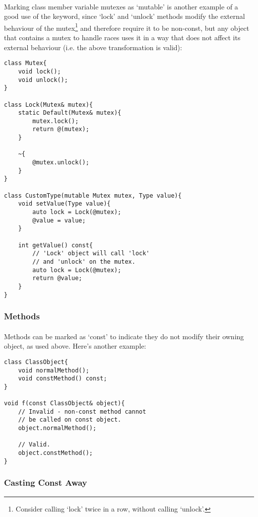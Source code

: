 \documentclass[12pt,twoside,notitlepage]{report}
\begin{document}
\paragraph{}
Marking class member variable mutexes as `mutable' is another example of a good use of the keyword, since `lock' and `unlock' methods modify the external behaviour of the mutex\footnote{Consider calling `lock' twice in a row, without calling `unlock'.} and therefore require it to be non-const, but any object that contains a mutex to handle races uses it in a way that does not affect its external behaviour (i.e. the above transformation is valid):

\begin{lstlisting}
class Mutex{
	void lock();
	void unlock();
}

class Lock(Mutex& mutex){
	static Default(Mutex& mutex){
		mutex.lock();
		return @(mutex);
	}
	
	~{
		@mutex.unlock();
	}
}

class CustomType(mutable Mutex mutex, Type value){
	void setValue(Type value){
		auto lock = Lock(@mutex);
		@value = value;
	}

	int getValue() const{
		// 'Lock' object will call 'lock'
		// and 'unlock' on the mutex.
		auto lock = Lock(@mutex);
		return @value;
	}
}
\end{lstlisting}

\subsubsection{Methods}

\paragraph{}
Methods can be marked as `const' to indicate they do not modify their owning object, as used above. Here's another example:

\begin{lstlisting}
class ClassObject{
	void normalMethod();
	void constMethod() const;
}

void f(const ClassObject& object){
	// Invalid - non-const method cannot
	// be called on const object.
	object.normalMethod();
	
	// Valid.
	object.constMethod();
}
\end{lstlisting}

\subsubsection{Casting Const Away}
\end{document}

